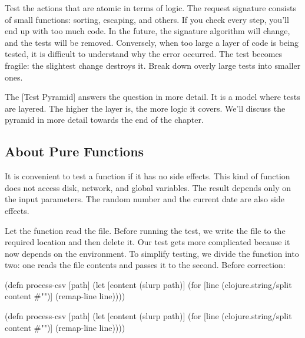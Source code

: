 Test the actions that are atomic in terms of logic. The request signature consists of small functions: sorting, escaping, and others. If you check every step, you'll end up with too much code. In the future, the signature algorithm will change, and the tests will be removed. Conversely, when too large a layer of code is being tested, it is difficult to understand why the error occurred. The test becomes fragile: the slightest change destroys it. Break down overly large tests into smaller ones.


The [Test Pyramid] answers the question in more detail. It is a model where tests are layered. The higher the layer is, the more logic it covers. We'll discuss the pyramid in more detail towards the end of the chapter.

\subsection{About Pure Functions}


It is convenient to test a function if it has no side effects. This kind of function does not access disk, network, and global variables. The result depends only on the input parameters. The random number and the current date are also side effects.

Let the function read the file. Before running the test, we write the file to the required location and then delete it. Our test gets more complicated because it now depends on the environment. To simplify testing, we divide the function into two: one reads the file contents and passes it to the second. Before correction:


\ifnarrow

\begin{english}
  \begin{clojure}
(defn process-csv [path]
  (let [content (slurp path)]
    (for [line (clojure.string/split
                 content #"\n")]
      (remap-line line))))
  \end{clojure}
\end{english}

\else

\begin{english}
  \begin{clojure}
(defn process-csv [path]
  (let [content (slurp path)]
    (for [line (clojure.string/split content #"\n")]
      (remap-line line))))
  \end{clojure}
\end{english}

